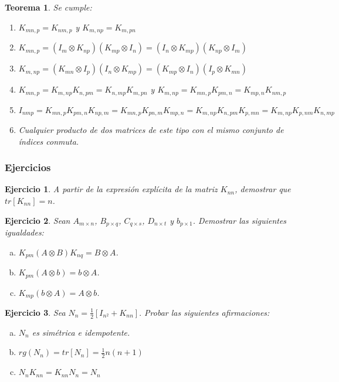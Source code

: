\documentclass{article}
\theoremstyle{theorem-style}  %
\newtheorem{theorem}{Teorema}[section]  %
\theoremstyle{definition-style}
\theoremstyle{example-style}
\theoremstyle{exercise-style}
\newtheorem{exercise}{Ejercicio}[section]
\begin{document}
	\begin{theorem} Se cumple:\\
		\begin{enumerate}
			\item  $K_{mn,p}=K_{nm,p}$ y $K_{m,np} = K_{m,pn} $ 
			
			\item $K_{mn,p}=(I_m \otimes K_{np})(K_{mp} \otimes I_n)=(I_n \otimes K_{mp})(K_{np} \otimes I_m)$
			
			\item $K_{m,np}=(K_{mn} \otimes I_p)(I_n \otimes K_{mp})=(K_{mp} \otimes I_n)(I_p \otimes K_{mn})$
			
			\item $K_{mn,p}= K_{m,np}K_{n,pm} = K_{n,mp}K_{m,pn}$ y $K_{m,np}= K_{mn,p}K_{pm,n} = K_{mp,n}K_{nm,p}$
			
			\item $I_{nmp}= K_{mn,p}K_{pm,n}K_{np,m}= K_{mn,p}K_{pn,m}K_{mp,n}=K_{m,np}K_{n,pm}K_{p,mn}=K_{m,np}K_{p,nm}K_{n,mp}$
			
			\item Cualquier producto de dos matrices de este tipo con el mismo conjunto de índices conmuta.
		\end{enumerate}	
	\end{theorem}
	
	\subsubsection{Ejercicios}
	
	\begin{exercise}
		A partir de la expresión explícita de la matriz $K_{nn}$, demostrar que $tr[K_{nn}] = n$.
	\end{exercise}
	
	\begin{exercise}
		Sean $A_{m\times n}$, $B_{p\times q}$, $C_{q\times s}$, $D_{n\times t}$ y $b_{p\times 1}$. Demostrar las siguientes igualdades:
		\begin{enumerate}[a)]
			\item $K_{pm}(A \otimes B)K_{nq} = B\otimes A$.
			\item $K_{pm}(A \otimes b) = b\otimes A$.
			\item $K_{mp}(b \otimes A) = A\otimes b$.
		\end{enumerate}
	\end{exercise}
	
	\begin{exercise}
		Sea $N_n = \frac{1}{2}[I_{n^2}+K_{nn}].$ Probar las siguientes afirmaciones:
		\begin{enumerate}[a)]
			\item $N_n$ es simétrica e idempotente.
			\item $rg(N_n) = tr[N_n] = \frac{1}{2}n(n+1)$
			\item $N_nK_{nn} = K_{nn}N_n = N_n$
		\end{enumerate}
	\end{exercise}
	
\end{document}
